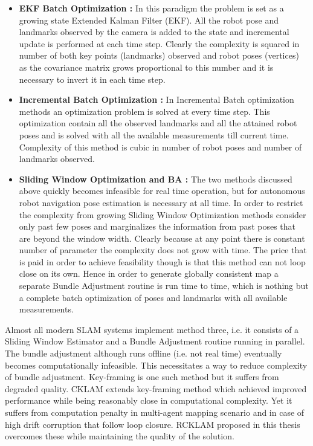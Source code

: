 \begin{itemize}
  \item \textbf{EKF Batch Optimization :} 
  In this paradigm the problem is set as a growing state Extended Kalman Filter (EKF). All the robot pose and landmarks observed by the camera is added to the state and incremental update is performed at each time step. Clearly the complexity is squared in number of both key points (landmarks) observed and robot poses (vertices) as the covariance matrix grows proportional to this number and it is necessary to invert it in each time step. 
  \item \textbf{Incremental Batch Optimization :} 
  In Incremental Batch optimization methods an optimization problem is solved at every time step. This optimization contain all the observed landmarks and all the attained robot poses and is solved with all the available measurements till current time. Complexity of this method is cubic in number of robot poses and number of landmarks observed.
  \item \textbf{Sliding Window Optimization and BA :} 
  The two methods discussed above quickly becomes infeasible for real time operation, but for autonomous robot navigation pose estimation is necessary at all time. In order to restrict the complexity from growing Sliding Window Optimization methods consider only past few poses and marginalizes the information from past poses that are beyond the window width. Clearly because at any point there is constant number of parameter the complexity does not grow with time. The price that is paid in order to achieve feasibility though is that this method can not loop close on its own. Hence in order to generate globally consistent map a separate Bundle Adjustment routine is run time to time, which is nothing but a complete batch optimization of poses and landmarks with all available measurements.
\end{itemize}

Almost all modern SLAM systems implement method three, i.e. it consists of a Sliding Window Estimator and a Bundle Adjustment routine running in parallel. The bundle adjustment although runs offline (i.e. not real time) eventually becomes computationally infeasible. This necessitates a way to reduce complexity of bundle adjustment. Key-framing is one such method but it suffers from degraded quality. CKLAM extends key-framing method which achieved improved performance while being reasonably close in computational complexity. Yet it suffers from computation penalty in multi-agent mapping scenario and in case of high drift corruption that follow loop closure. RCKLAM proposed in this thesis overcomes these while maintaining the quality of the solution.

